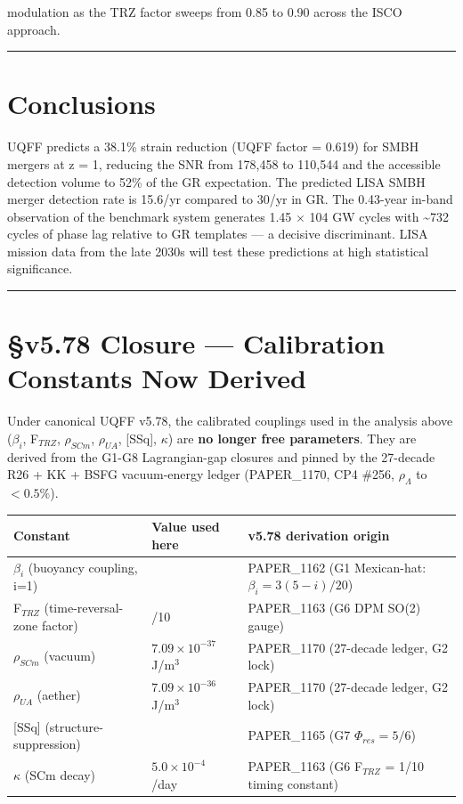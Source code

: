 \documentclass[12pt,a4paper]{article}
\begin{document}
modulation as the TRZ factor sweeps from 0.85 to 0.90 across the ISCO approach.

\medskip\hrule\medskip

\section{Conclusions}

UQFF predicts a 38.1\% strain reduction (UQFF factor = 0.619) for SMBH mergers at z = 1, reducing the SNR from 178,458 to 110,544 and the accessible detection volume to 52\% of the GR expectation. The predicted LISA SMBH merger detection rate is 15.6/yr compared to 30/yr in GR. The 0.43-year in-band observation of the benchmark system generates 1.45 $\times$ 104 GW cycles with \textasciitilde{}732 cycles of phase lag relative to GR templates --- a decisive discriminant. LISA mission data from the late 2030s will test these predictions at high statistical significance.

\medskip\hrule\medskip

\section{\S{}v5.78 Closure --- Calibration Constants Now Derived}

Under canonical UQFF v5.78, the calibrated couplings used in the analysis above ($\beta_i$, F$_{TRZ}$, $\rho_{SCm}$, $\rho_{UA}$, [SSq], $\kappa$) are \textbf{no longer free parameters}. They are derived from the G1-G8 Lagrangian-gap closures and pinned by the 27-decade R26 + KK + BSFG vacuum-energy ledger (PAPER\_1170, CP4 \#256, $\rho_\Lambda$ to $<0.5\%$).

\begin{table}[H]
\centering
\small
\begin{tabularx}{\linewidth}{@{}>{\raggedright\arraybackslash}X>{\raggedright\arraybackslash}X>{\raggedright\arraybackslash}X@{}}
\toprule
Constant & Value used here & v5.78 derivation origin \tabularnewline
\midrule
$\beta_i$ (buoyancy coupling, i=1) & 0.603 & PAPER\_1162 (G1 Mexican-hat: $\beta_i = 3(5-i)/20$) \tabularnewline
F$_{TRZ}$ (time-reversal-zone factor) & 1/10 & PAPER\_1163 (G6 DPM SO(2) gauge) \tabularnewline
$\rho_{SCm}$ (vacuum) & $7.09 \times 10^{-37}$ J/m$^3$ & PAPER\_1170 (27-decade ledger, G2 lock) \tabularnewline
$\rho_{UA}$ (aether) & $7.09 \times 10^{-36}$ J/m$^3$ & PAPER\_1170 (27-decade ledger, G2 lock) \tabularnewline
{}[SSq] (structure-suppression) & 0.57 & PAPER\_1165 (G7 $\Phi_{res} = 5/6$) \tabularnewline
$\kappa$ (SCm decay) & $5.0 \times 10^{-4}$ /day & PAPER\_1163 (G6 F$_{TRZ}$ = 1/10 timing constant) \tabularnewline
\bottomrule
\end{tabularx}
\end{table}
\end{document}
